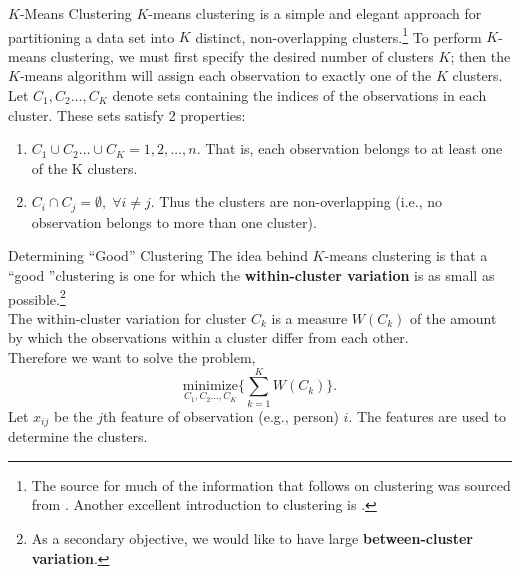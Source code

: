\documentclass[pdf]{beamer}
\newcommand{\empr}[1]{{\color{franklinblue}\textbf{#1}}}
\theoremstyle{remark}
\theoremstyle{definition}
\begin{document}
\begin{frame}[t]{$K$-Means Clustering}
$K$-means clustering is a simple and elegant approach for partitioning a
data set into $K$ distinct, non-overlapping clusters.\footnote{The source for much of the information that follows on clustering was sourced from \cite{hastie2009}.  Another excellent introduction to clustering is \cite{everitt2011}.} To perform $K$-means clustering, we must first specify the desired number of clusters $K$; then the $K$-means algorithm will assign each observation to exactly one of the $K$ clusters. \\
\vspace{1.5ex}
Let $C_1, C_2 \ldots, C_K$ denote sets containing the indices of the observations in each cluster. These sets satisfy 2 properties: \\
\vspace{0.0ex}
\small
\begin{enumerate}
\item $C_1 \cup C_2 \ldots \cup C_K = {1,2,\ldots,n}$.  That is, each observation
belongs to at least one of the K clusters.
\item $C_i \cap C_j = \emptyset, \; \forall i \neq j$. Thus the clusters are non-overlapping (i.e., no observation belongs to more than one cluster).
\end{enumerate}
\end{frame}

\begin{frame}[t]{Determining ``Good'' Clustering}
 The idea behind $K$-means clustering is that a ``good ''clustering is one for which the \empr{within-cluster variation} is as small as possible.\footnote{As a secondary objective, we would like to have large \empr{between-cluster variation}.} \\ 
\vspace{1.5ex}
The within-cluster variation for cluster $C_k$ is a measure $W(C_k)$ of the amount by which the observations within a cluster differ from each other.  \\
\vspace{1.5ex}
Therefore we want to solve the problem, \\
\vspace{0.0ex}
\begin{equation}\label{eq1}
\underset{C_1, C_2 \ldots, C_K}{\text{minimize}} \bigg\{ \sum_{k=1}^{K} W(C_k) \bigg\}.
\end{equation}
Let $x_{ij}$ be the $j$th feature of observation (e.g., person) $i$.  The features are used to determine the clusters. 
\end{frame}
\end{document}
